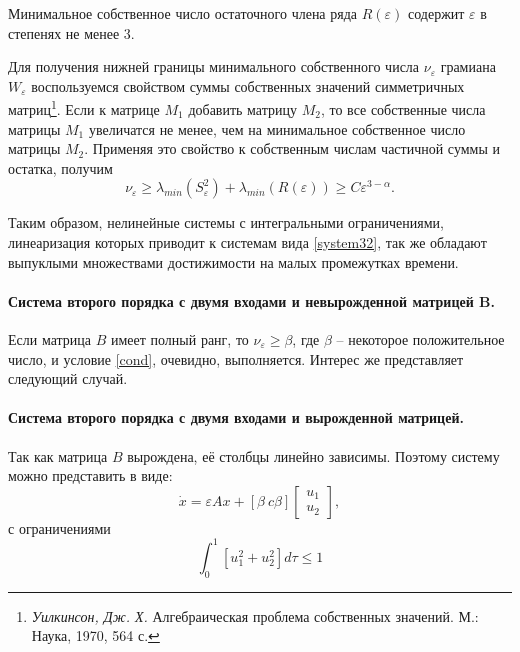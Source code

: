 \documentclass[../main.tex]{subfiles}
\begin{document}
Минимальное собственное число остаточного члена ряда $ R(\varepsilon) $ содержит $ \varepsilon $ в степенях не менее 3.

Для получения нижней границы минимального собственного числа $ \nu_{\varepsilon} $ грамиана $ W_{\varepsilon}$ воспользуемся свойством суммы собственных значений симметричных матриц\footnote{\textit{Уилкинсон, Дж. Х.} Алгебраическая проблема собственных значений. М.: Наука, 1970, 564 с.}. Если к матрице $ M_1 $ добавить матрицу $ M_2 $, то все собственные числа матрицы $ M_1 $ увеличатся не менее, чем на минимальное собственное число матрицы $ M_2 $. Применяя это свойство к собственным числам частичной суммы и остатка, получим
\begin{equation}
	\nu_{\varepsilon} \geq \lambda_{min}(S_{\varepsilon}^{2}) + \lambda_{min}(R(\varepsilon)) \geq C \varepsilon^{3-\alpha}.
\end{equation}

Таким образом, нелинейные системы с интегральными ограничениями, линеаризация которых приводит к системам вида \eqref{system32},  так же обладают выпуклыми множествами достижимости на малых промежутках времени.
\paragraph{Система второго порядка с двумя входами и невырожденной матрицей B.}
Если матрица $ B $ имеет полный ранг, то $\nu_{\varepsilon} \geq \beta $, где $ \beta $ -- некоторое положительное число, и условие \eqref{cond}, очевидно, выполняется. Интерес же представляет следующий случай.
\paragraph{Система второго порядка с двумя входами и вырожденной матрицей.}
Так как матрица $  B $ вырождена, её столбцы линейно зависимы. Поэтому систему можно представить в виде:
\begin{equation}\label{system4}
	\dot{x} = \varepsilon A x + \left[ \beta \ c\beta \right]  {\left[ {\begin{array}{*{20}{c}}
				{{u_1}}\\
				{{u_2}}
		\end{array}} \right]}, 
\end{equation}
с ограничениями 
\begin{equation}\label{contrainsts1}
	\int_{0}^{1} \left[ u_1^2 + u_2^2 \right] d \tau \leq 1
\end{equation}
\end{document}
